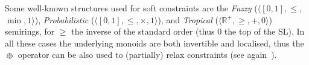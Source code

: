 \documentclass{llncs}
\newcommand{\shortNoProof}[1]{ }
\def\monop{\otimes}
\def\odiv{\, {\ominus\hspace{-7.7pt} \div} \,}
\begin{document}
\begin{remark}\label{rmk:soft}
	Some well-known structures used for soft constraints are the 
	\emph{Fuzzy} ($\langle [0,1], \leq,$ $\min, 1 \rangle$), \emph{Probabilistic} ($\langle [0,1], \leq, \allowbreak\times, 1 \rangle$), 
	and \emph{Tropical}   ($\langle \mathbb{R}^+, \geq, +, 0 \rangle$) semirings, for $\geq$ the inverse of the standard order 
	(thus $0$ the top of the SL). In all these cases the underlying monoids 
	are both invertible and localised, thus
	the $\odiv$ operator can be also used to
	(partially) relax constraints (see again~\cite{ecai06}).
\end{remark}

\shortNoProof{
\begin{proof} Let $X \subseteq A$ be a finite non-empty set. 	
	\[\forall x \in X.\, x \leq \bigvee X %
	\implies \forall x \in X.\, a \monop x \leq a \monop \bigvee X \implies \bigvee \{a \monop x \mid x \in X\} \leq a \monop  \bigvee X .\]

	\[\forall y \in X.\, a \monop y \leq \bigvee \{a \monop x \mid x \in X\} \implies 
	\forall y \in X.\, y \leq (\bigvee \{a \monop x \mid x \in X\}) \odiv a \implies\] 
	\[ \implies \bigvee X \leq (\bigvee \{a \monop x \mid x \in X\}) \odiv a \implies 
	a \monop \bigvee X \leq \bigvee \{a \monop x \mid x \in X\} .\] 
\qed
\end{proof}
}
\end{document}
